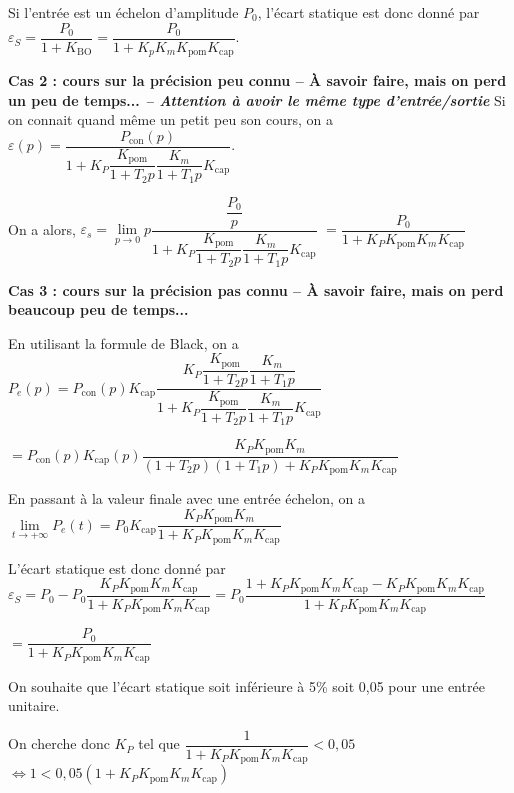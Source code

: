 Si l'entrée est un échelon d'amplitude $P_0$, l'écart statique est donc donné par 
$\varepsilon_S = \dfrac{P_0}{1+K_{\text{BO}}}= \dfrac{P_0}{1+K_p K_m K_{\text{pom}}K_{\text{cap}}}$.



\textbf{Cas 2 : cours sur la précision peu connu -- À savoir faire, mais on perd un peu de temps... \textit{-- Attention à avoir le même type d'entrée/sortie}}
Si on connait quand même un petit peu son cours, on a 
$\varepsilon(p)
=
\dfrac{P_{\text{con}}(p)}%
{1+K_P \dfrac{K_{\text{pom}}}{1+T_2 p} \dfrac{K_m}{1+T_1 p} K_{\text{cap}}}$.

On a alors,
$\varepsilon_s = \lim\limits_{p\to 0} p 
\dfrac{\dfrac{P_0}{p}}%
{1+K_P \dfrac{K_{\text{pom}}}{1+T_2 p} \dfrac{K_m}{1+T_1 p} K_{\text{cap}}}$
$=
\dfrac{P_0}%
{1+K_P K_{\text{pom}}K_m K_{\text{cap}}}
$

\textbf{Cas 3 : cours sur la précision pas connu -- À savoir faire, mais on perd beaucoup peu de temps...}

En utilisant la formule de Black, on a $P_e(p) 
= P_{\text{con}}(p) K_{\text{cap}} 
\dfrac{K_P \dfrac{K_{\text{pom}}}{1+T_2 p} \dfrac{K_m}{1+T_1 p} }%
{1+K_P \dfrac{K_{\text{pom}}}{1+T_2 p} \dfrac{K_m}{1+T_1 p} K_{\text{cap}}}$

$= P_{\text{con}}(p) K_{\text{cap}}(p) 
\dfrac{K_P K_{\text{pom}}K_m }%
{\left(1+T_2 p\right)\left(1+T_1 p\right)+K_P K_{\text{pom}} K_m K_{\text{cap}}}$

En passant à la valeur finale avec une entrée échelon, on a 
$\lim\limits_{t\to +\infty}P_e(t) =  P_{0} K_{\text{cap}} 
\dfrac{K_P K_{\text{pom}}K_m }%
{1+K_P K_{\text{pom}} K_m K_{\text{cap}}}$

L'écart statique est donc donné par
$
\varepsilon_S = P_0 - P_{0} 
\dfrac{K_P K_{\text{pom}}K_m K_{\text{cap}} }%
{1+K_P K_{\text{pom}} K_m K_{\text{cap}}}
= P_0
\dfrac{1+K_P K_{\text{pom}} K_m K_{\text{cap}} - K_P K_{\text{pom}}K_m K_{\text{cap}} }{1+K_P K_{\text{pom}} K_m K_{\text{cap}}}
$

$= 
\dfrac{P_0}{1+K_P K_{\text{pom}} K_m K_{\text{cap}}}$

\else 
\fi

\ifprof
On souhaite que l'écart statique soit inférieure à 5\% soit 0,05 pour une entrée unitaire. 

On cherche donc $K_P$ tel que 
$\dfrac{1}{1+K_P K_{\text{pom}} K_m K_{\text{cap}}}<0,05 $
$ \Leftrightarrow 1<0,05\left(1+K_P K_{\text{pom}} K_m K_{\text{cap}}\right)$

